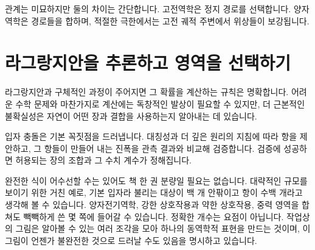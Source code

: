 관계는 미묘하지만 둘의 차이는 간단합니다. 고전역학은 정지 경로를 선택합니다. 양자역학은 경로들을 합하며, 적절한 극한에서는 고전 궤적 주변에서 위상들이 보강됩니다.

\section{라그랑지안을 추론하고 영역을 선택하기}

라그랑지안과 구체적인 과정이 주어지면 그 확률을 계산하는 규칙은 명확합니다. 어려운 수학 문제와 마찬가지로 계산에는 독창적인 발상이 필요할 수 있지만, 더 근본적인 불확실성은 자연이 어떤 장과 결합을 사용하는지 알아내는 데 있습니다.

\begin{classroomqa}
\end{classroomqa}

입자 충돌은 기본 꼭짓점을 드러냅니다. 대칭성과 더 깊은 원리의 지침에 따라 항을 제안하고, 그 항들이 만들어 내는 진폭을 관측 결과와 비교해 검증합니다. 검증에 성공하면 허용되는 장의 조합과 그 수치 계수가 정해집니다.

\begin{classroomqa}
\end{classroomqa}

완전한 식이 어수선할 수는 있어도 책 한 권 분량일 필요는 없습니다. 대략적인 규모를 보이기 위한 거친 예로, 기본 입자라 불리는 대상이 백 개 안팎이고 항이 수백 개라고 생각해 볼 수 있습니다. 양자전기역학, 강한 상호작용과 약한 상호작용, 중력 영역을 합쳐도 빽빽하게 쓴 몇 쪽에 들어갈 수 있습니다. 정확한 개수는 요점이 아닙니다. 작업상의 그림은 알아볼 수 있는 여러 조각을 모아 하나의 동역학적 표현을 만드는 것이며, 이 그림이 언젠가 불완전한 것으로 드러날 수도 있음을 명시하고 있습니다.

